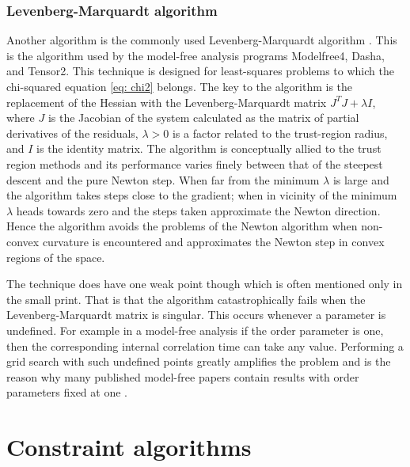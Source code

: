 \subsubsection{Levenberg-Marquardt algorithm}

Another algorithm is the commonly used Levenberg-Marquardt algorithm \citep{Levenberg44,Marquardt63}.
This is the algorithm used by the model-free analysis programs Modelfree4, Dasha, and Tensor2.
This technique is designed for least-squares problems to which the chi-squared equation \eqref{eq: chi2} belongs.  The key to the algorithm is the replacement of the Hessian with the Levenberg-Marquardt matrix $J^T J + \lambda I$, where $J$ is the Jacobian of the system calculated as the matrix of partial derivatives of the residuals, $\lambda > 0$ is a factor related to the trust-region radius, and $I$ is the identity matrix.  The algorithm is conceptually allied to the trust region methods and its performance varies finely between that of the steepest descent and the pure Newton step.  When far from the minimum $\lambda$ is large and the algorithm takes steps close to the gradient; when in vicinity of the minimum $\lambda$ heads towards zero and the steps taken approximate the Newton direction.  Hence the algorithm avoids the problems of the Newton algorithm when non-convex curvature is encountered and approximates the Newton step in convex regions of the space.

The technique does have one weak point though which is often mentioned only in the small print.
That is that the algorithm catastrophically fails when the Levenberg-Marquardt matrix is singular.
This occurs whenever a parameter is undefined.
For example in a model-free analysis if the order parameter is one, then the corresponding internal correlation time can take any value.
Performing a grid search with such undefined points greatly amplifies the problem and is the reason why many published model-free papers contain results with order parameters fixed at one \citep{dAuvergneGooley08a}.




\section{Constraint algorithms}
\label{sect: constraint algorithms}

